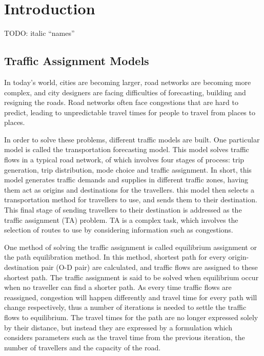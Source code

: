 \chapter{Introduction}
{
    TODO: italic ``names''
}
\section{Traffic Assignment Models}

\begin{comment}
Finding the minimum paths is the most computation-intensive compo-
nent of each iteration of most UE solution procedures (and, in particular, the
convex combinations algorithm). The other components (loading the mini-
/ths, the line search, the updates, and the convergence checks) do not
require more than a few percentages of the total CPU time. 
\citep{Sheffi}
\end{comment}

In today's world, cities are becoming larger, 
road networks are becoming more complex,
and city designers are facing difficulties of 
forecasting, building and resigning the roads.
Road networks often face congestions that are hard to predict,
leading to unpredictable travel times for people to travel from places to places.

In order to solve these problems,
different traffic models are built.
One particular model is called the transportation forecasting model.
This model solves traffic flows in a typical road network,
of which involves four stages of process: trip generation,
trip distribution, mode choice and traffic assignment.
In short,
this model generates traffic demands and supplies in different traffic zones,
having them act as origins and destinations for the travellers.
this model then selects a transportation method for travellers
to use, and sends them to their destination.
This final stage of sending travellers to their destination is
addressed as the traffic assignment (TA) problem.
TA is a complex task,
which involves the selection of routes to use by considering information such as congestions.

One method of solving the traffic assignment is called 
equilibrium assignment or the path equilibration method.
In this method, 
shortest path for every origin-destination pair (O-D pair) are calculated, 
and traffic flows are assigned to these shortest path.
The traffic assignment is said to be solved when equilibrium occur when no traveller can find a shorter path.
As every time traffic flows are reassigned,
congestion will happen differently and 
travel time for every path will change respectively,
thus a number of iterations is needed to settle the traffic flows
to equilibrium.
The travel times for the path are no longer expressed solely by their
distance,
but instead they are expressed by a formulation which considers
parameters such as the travel time from the previous iteration,
the number of travellers and the capacity of the road.

